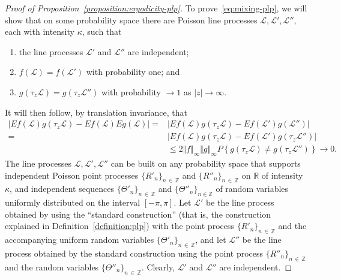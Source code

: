 \documentclass[10pt]{amsart}
\theoremstyle{definition}\newtheorem{defi}[theo]{Definition}\newtheorem{rema}[theo]{Remark}\newtheorem{exam}[theo]{Example}\newtheorem{exem}[theo]{Example}\newtheorem{nota}[theo]{Notation}
\newcommand{\xnorm}[1]{ \Vert #1 \Vert }
\newcommand{\zz}[1]{\mathbb #1}
\newcommand*{\alphenumi}{\renewcommand*{\theenumi}{\alph{enumi}}}
\begin{document}
\begin{proof}[Proof of Proposition~\ref{proposition:ergodicity-plp}]
To prove~\eqref{eq:mixing-plp}, we will show that on some probability space there are Poisson line processes $\mathcal{L},\mathcal{L}',\mathcal{L}''$, each with intensity $\kappa$, such that
\begin{enumerate}\alphenumi
\item\label{listproof2.7.1} the line processes $\mathcal{L}'$ and $\mathcal{L}''$ are independent;
\item \label{listproof2.7.2} $f (\mathcal{L})=f (\mathcal{L}')$ with probability one; and
\item \label{listproof2.7.3} $g (\tau_{z}\mathcal{L})=g (\tau_{z}\mathcal{L}'')$ with probability $\rightarrow 1$ as $|z| \rightarrow \infty$.
\end{enumerate}
It will then follow, by translation invariance, that
\begin{align*}
|Ef (\mathcal{L})g(\tau_{z}\mathcal{L})-Ef (\mathcal{L})Eg (\mathcal{L})|=&|Ef (\mathcal{L})g(\tau_{z}\mathcal{L})-Ef (\mathcal{L}')g(\mathcal{L}'')|\\
=&|Ef (\mathcal{L})g(\tau_{z}\mathcal{L})-Ef (\mathcal{L}')g (\tau_{z}\mathcal{L}'')|\\
&\leq 2\xnorm{f}_{\infty}\xnorm{g}_{\infty} P\left\{g (\tau_{z}\mathcal{L})\not =g (\tau_{z}\mathcal{L}'') \right\}
\longrightarrow 0.
\end{align*}
The line processes $\mathcal{L},\mathcal{L}',\mathcal{L}''$ can be built on any probability space that supports independent Poisson point processes $\{R'_{n} \}_{n\,\in\,\zz{Z}}$ and $\{R''_{n} \}_{n\,\in\,\zz{Z}}$ on $\zz{R}$ of intensity $\kappa$, and independent sequences $\{\Theta '_{n}\}_{n\,\in\,\zz{Z}}$ and $\{\Theta ''_{n} \}_{n\in\zz{Z}}$ of random variables uniformly distributed on the interval $[-\pi,\pi]$. Let $\mathcal{L}'$ be the line process obtained by using the ``standard construction'' (that is, the construction explained in Definition~\ref{definition:plp}) with the point process $\{R'_{n} \}_{n\,\in\,\zz{Z}}$ and the accompanying uniform random variables $\{\Theta '_{n}\}_{n\,\in\,\zz{Z}}$, and let $\mathcal{L}''$ be the line process obtained by the standard construction using the point process $\{R''_{n} \}_{n\,\in\,\zz{Z}}$ and the random variables $\{\Theta ''_{n}\}_{n\,\in\,\zz{Z}}$. Clearly, $\mathcal{L}'$ and $\mathcal{L}''$ are independent.


\end{proof}
\end{document}
